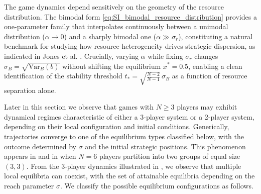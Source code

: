 \documentclass{article}
\begin{document}
                    The game dynamics depend sensitively on the geometry of the resource distribution. The bimodal form \eqref{eq:SI_bimodal_resource_distribution} provides a one-parameter family that interpolates continuously between a unimodal distribution ($\alpha \to 0$) and a sharply bimodal one ($\alpha \gg \sigma_r$), constituting a natural benchmark for studying how resource heterogeneity drives strategic dispersion, as indicated in Jones et al. \cite{jones2022polarization}. Crucially, varying $\alpha$ while fixing $\sigma_r$ changes $\sigma_B = \sqrt{\mathrm{Var}_B(b)}$ without shifting the equilibrium $x^* = 0.5$, enabling a clean identification of the stability threshold $t_* = \sqrt{\frac{N-2}{N-1}}\,\sigma_B$ as a function of resource separation alone.

                    Later in this section we observe that games with $N \geq 3$ players may exhibit dynamical regimes characteristic of either a 3-player system or a 2-player system, depending on their local configuration and initial conditions. Generically, trajectories converge to one of the equilibrium types classified below, with the outcome determined by $\sigma$ and the initial strategic positions. This phenomenon appears in   and in  when $N=6$ players partition into two groups of equal size $(3,3)$. From the 3-player dynamics illustrated in , we observe that multiple local equilibria can coexist, with the set of attainable equilibria  depending on the reach parameter $\sigma$. We classify the possible equilibrium configurations as follows.
\end{document}
